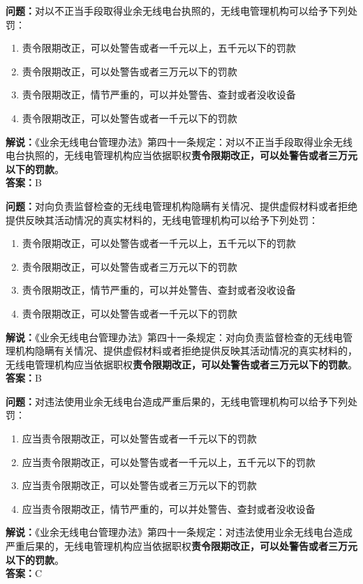 \bigskip


\noindent\textbf{问题：}对以不正当手段取得业余无线电台执照的，无线电管理机构可以给予下列处罚：
\begin{enumerate}[label=\Alph*), leftmargin=3em]
  \item 责令限期改正，可以处警告或者一千元以上，五千元以下的罚款
  \item 责令限期改正，可以处警告或者三万元以下的罚款
  \item 责令限期改正，情节严重的，可以并处警告、查封或者没收设备
  \item 责令限期改正，可以处警告或者一千元以下的罚款
\end{enumerate}
\noindent\textbf{解说：}《业余无线电台管理办法》第四十一条规定：对以不正当手段取得业余无线电台执照的，无线电管理机构应当依据职权\textbf{责令限期改正，可以处警告或者三万元以下的罚款}。\\\textbf{答案：}B

\bigskip


\noindent\textbf{问题：}对向负责监督检查的无线电管理机构隐瞒有关情况、提供虚假材料或者拒绝提供反映其活动情况的真实材料的，无线电管理机构可以给予下列处罚：
\begin{enumerate}[label=\Alph*), leftmargin=3em]
  \item 责令限期改正，可以处警告或者一千元以上，五千元以下的罚款
  \item 责令限期改正，可以处警告或者三万元以下的罚款
  \item 责令限期改正，情节严重的，可以并处警告、查封或者没收设备
  \item 责令限期改正，可以处警告或者一千元以下的罚款
\end{enumerate}
\noindent\textbf{解说：}《业余无线电台管理办法》第四十一条规定：对向负责监督检查的无线电管理机构隐瞒有关情况、提供虚假材料或者拒绝提供反映其活动情况的真实材料的，无线电管理机构应当依据职权\textbf{责令限期改正，可以处警告或者三万元以下的罚款}。\\\textbf{答案：}B

\bigskip


\noindent\textbf{问题：}对违法使用业余无线电台造成严重后果的，无线电管理机构可以给予下列处罚：
\begin{enumerate}[label=\Alph*), leftmargin=3em]
  \item 应当责令限期改正，可以处警告或者一千元以下的罚款
  \item 应当责令限期改正，可以处警告或者一千元以上，五千元以下的罚款
  \item 应当责令限期改正，可以处警告或者三万元以下的罚款
  \item 应当责令限期改正，情节严重的，可以并处警告、查封或者没收设备
\end{enumerate}
\noindent\textbf{解说：}《业余无线电台管理办法》第四十一条规定：对违法使用业余无线电台造成严重后果的，无线电管理机构应当依据职权\textbf{责令限期改正，可以处警告或者三万元以下的罚款}。\\\textbf{答案：}C

